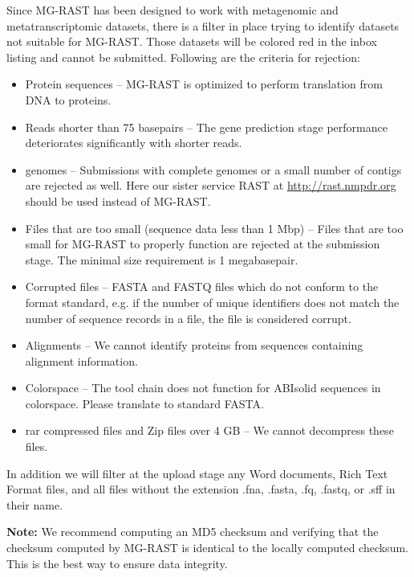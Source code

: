 \documentclass[12pt,fullpage]{report}
\begin{document}
Since MG-RAST has been designed to work with metagenomic and metatranscriptomic datasets, there is a filter in place trying to identify
datasets not suitable for MG-RAST. Those datasets will be colored red in the inbox listing and cannot be submitted.
Following are the criteria for rejection:

\begin{itemize}
\item Protein sequences --
MG-RAST is optimized to perform translation from DNA to proteins.

\item Reads shorter than 75 basepairs --
The gene prediction stage performance deteriorates significantly with shorter reads.

\item genomes --
Submissions with complete genomes or a small number of contigs are rejected as well. Here our sister service RAST at \url{http://rast.nmpdr.org} should be used instead of MG-RAST.

\item Files that are too small (sequence data less than 1 Mbp) --
Files that are too small for MG-RAST to properly function are rejected at the submission stage. The minimal size requirement is 1 megabasepair.

\item Corrupted files --
FASTA and FASTQ files which do not conform to the format standard, e.g. if the number of unique identifiers does not match the number of sequence records in a file, the file is considered corrupt.

\item Alignments --
We cannot identify proteins from sequences containing alignment information.

\item Colorspace --
The tool chain does not function for ABIsolid sequences in colorspace. Please translate to standard FASTA.

\item rar compressed files and Zip files over 4 GB --
We cannot decompress these files.

\end{itemize}

In addition we will filter at the upload stage any Word documents, Rich Text Format files, and all
files without the extension .fna, .fasta, .fq, .fastq, or .sff in their name.


\textbf{Note:} We recommend computing an \gls{MD5} checksum and verifying that the checksum computed by MG-RAST is identical to the locally computed checksum. This is the best way to ensure data integrity.
\end{document}
